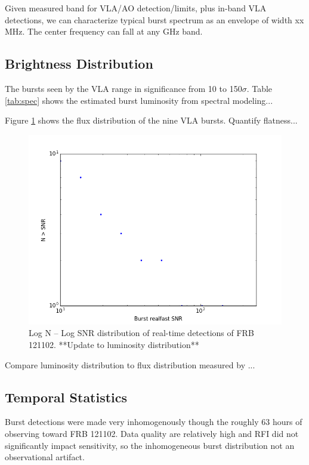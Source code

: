\documentclass{emulateapj}
\begin{document}
Given measured band for VLA/AO detection/limits, plus in-band VLA detections, we can characterize typical burst spectrum as an envelope of width xx MHz. The center frequency can fall at any GHz band.

\subsection{Brightness Distribution}

The bursts seen by the VLA range in significance from 10 to 150$\sigma$. Table \ref{tab:spec} shows the estimated burst luminosity from spectral modeling...

Figure \ref{fig:logns} shows the flux distribution of the nine VLA bursts. Quantify flatness...

\begin{figure}[htb]
\begin{center}
\includegraphics[width=0.9\columnwidth]{logns}
\caption{Log N -- Log SNR distribution of real-time detections of FRB 121102. **Update to luminosity distribution**
\label{fig:logns}}
\end{center}
\end{figure}

Compare luminosity distribution to flux distribution measured by \citep{2016ApJ...830...75V}...

\subsection{Temporal Statistics}
Burst detections were made very inhomogenously though the roughly 63 hours of observing toward FRB 121102. Data quality are relatively high and RFI did not significantly impact sensitivity, so the inhomogeneous burst distribution not an observational artifact.
\end{document}
